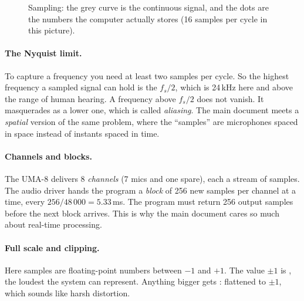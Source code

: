 \documentclass[11pt]{article}
\begin{document}
\begin{figure}[ht]
\centering
{}
\caption{Sampling: the grey curve is the continuous signal, and the dots are the numbers the
computer actually stores (16 samples per cycle in this picture).}
\label{fig:samples}
\end{figure}

\paragraph{The Nyquist limit.} To capture a frequency you need at least two samples per cycle.
So the highest frequency a sampled signal can hold is the 
$f_s/2$, which is 24\,kHz here and above the range of human hearing. A frequency above $f_s/2$ does
not vanish. It masquerades as a lower one, which is called \emph{aliasing}. The main document
meets a \emph{spatial} version of the same problem, where the ``samples'' are microphones spaced
in space instead of instants spaced in time.

\paragraph{Channels and blocks.} The UMA-8 delivers 8 \emph{channels} (7 mics and one spare),
each a stream of samples. The audio driver hands the program a \emph{block} of 256 new samples
per channel at a time, every $256/48\,000=5.33$\,ms. The program must return 256 output samples
before the next block arrives. This is why the main document cares so much about real-time
processing.

\paragraph{Full scale and clipping.} Here samples are floating-point numbers between $-1$ and $+1$.
The value $\pm1$ is , the loudest the system can represent. Anything
bigger gets : flattened to $\pm1$, which sounds like harsh distortion.
\end{document}
